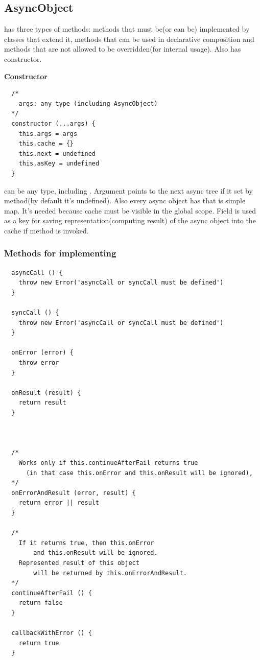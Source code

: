 \documentclass{article}
\begin{document}
\subsection{AsyncObject}

 has three types of methods: methods that must be(or can be) implemented by classes that extend it, methods that can be used in declarative composition and methods that are not allowed to be overridden(for internal usage). Also  has constructor.

\vspace*{10px}
\noindent
\textbf{Constructor}

\begin{verbatim}
  /*
    args: any type (including AsyncObject)
  */
  constructor (...args) {
    this.args = args
    this.cache = {}
    this.next = undefined
    this.asKey = undefined
  }
\end{verbatim}
 can be any type, including . Argument  points to the next async tree if it set by  method(by default it's undefined). Also every async object has  that is simple map. It's needed because cache must be visible in the global scope. Field  is used as a key for saving representation(computing result) of the async object into the cache if method  is invoked.

\vspace*{10px}

\subsubsection{Methods for implementing}

\begin{verbatim}
  asyncCall () {
    throw new Error('asyncCall or syncCall must be defined')
  }

  syncCall () {
    throw new Error('asyncCall or syncCall must be defined')
  }

  onError (error) {
    throw error
  }

  onResult (result) {
    return result
  }



  /*
    Works only if this.continueAfterFail returns true
      (in that case this.onError and this.onResult will be ignored),
  */
  onErrorAndResult (error, result) {
    return error || result
  }

  /*
    If it returns true, then this.onError
        and this.onResult will be ignored.
    Represented result of this object
        will be returned by this.onErrorAndResult.
  */
  continueAfterFail () {
    return false
  }

  callbackWithError () {
    return true
  }
\end{verbatim}
\end{document}
